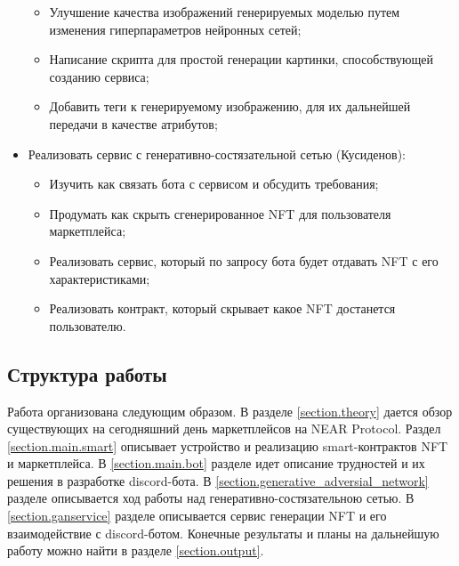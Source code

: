 \begin{itemize}
\begin{itemize}
        \item Улучшение качества изображений генерируемых моделью путем изменения гиперпараметров нейронных сетей;
        \item Написание скрипта для простой генерации картинки, способствующей созданию сервиса;
        \item Добавить теги к генерируемому изображению, для их дальнейшей передачи в качестве атрибутов;
    \end{itemize}
        \item Реализовать сервис с генеративно-состязательной сетью (Кусиденов):
    \begin{itemize}
    	\item Изучить как связать бота с сервисом и обсудить требования;
    	\item Продумать как скрыть сгенерированное NFT для пользователя маркетплейса;
    	\item Реализовать сервис, который по запросу бота будет отдавать NFT с его характеристиками;
    	\item Реализовать контракт, который скрывает какое NFT достанется пользователю.
    \end{itemize}
\end{itemize}

\subsection{Структура работы}

Работа организована следующим образом. В разделе {\color{blue} \ref{section.theory}} дается обзор существующих на сегодняшний день маркетплейсов на NEAR Protocol. Раздел {\color{blue} \ref{section.main.smart}} описывает устройство и реализацию smart-контрактов NFT и маркетплейса. В {\color{blue} \ref{section.main.bot}} разделе идет описание трудностей и их решения в разработке discord-бота. В {\color{blue} \ref{section.generative_adversial_network}} разделе описывается ход работы над генеративно-состязательною сетью. В {\color{blue} \ref{section.ganservice}} разделе описывается сервис генерации NFT и его взаимодействие с discord-ботом.
Конечные результаты и планы на дальнейшую работу можно найти в разделе {\color{blue} \ref{section.output}}.
